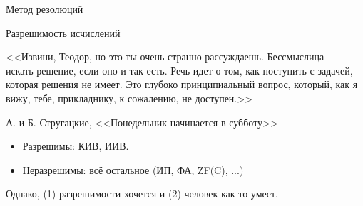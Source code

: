 \documentclass[aspectratio=169]{beamer}
\begin{document}
\newcommand\doubleplus{+\kern-1.3ex+\kern0.8ex}
\newcommand\mdoubleplus{\ensuremath{\mathbin{+\mkern-10mu+}}}

\begin{frame}{}
\begin{center}\Large Метод резолюций \end{center}
\end{frame}

\begin{frame}{Разрешимость исчислений}
\footnotesize{\flushright <<Извини, Теодор, но это ты очень странно рассуждаешь. Бессмыслица — искать решение, если оно и так есть. 
Речь идет о том, как поступить с задачей, которая решения не имеет. 
Это глубоко принципиальный вопрос, который, как я вижу, тебе, прикладнику, к сожалению, не доступен.>>

\vspace{0.3cm}
А. и Б. Стругацкие, <<Понедельник начинается в субботу>>}

\vspace{1cm}\pause

\normalsize


\begin{itemize}
\item Разрешимы: КИВ, ИИВ.
\item Неразрешимы: всё остальное (ИП, ФА, ZF(C), ...)
\end{itemize}

\pause

\vspace{0.5cm}
\noindent Однако, (1) разрешимости хочется \pause и (2) человек как-то умеет.

\end{frame}
\end{document}
